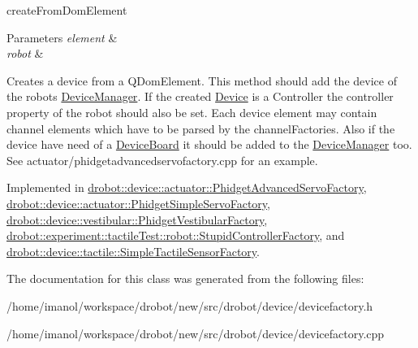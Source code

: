 create\-From\-Dom\-Element 


\begin{DoxyParams}{Parameters}
{\em element} & \\
\hline
{\em robot} & \\
\hline
\end{DoxyParams}
Creates a device from a Q\-Dom\-Element. This method should add the device of the robots \hyperlink{classdrobot_1_1device_1_1DeviceManager}{Device\-Manager}. If the created \hyperlink{classdrobot_1_1device_1_1Device}{Device} is a Controller the controller property of the robot should also be set. Each device element may contain channel elements which have to be parsed by the channel\-Factories. Also if the device have need of a \hyperlink{classdrobot_1_1device_1_1DeviceBoard}{Device\-Board} it should be added to the \hyperlink{classdrobot_1_1device_1_1DeviceManager}{Device\-Manager} too. See actuator/phidgetadvancedservofactory.\-cpp for an example. 

Implemented in \hyperlink{classdrobot_1_1device_1_1actuator_1_1PhidgetAdvancedServoFactory_a05fc8ede82777f4310ac0cf96e705dbe}{drobot\-::device\-::actuator\-::\-Phidget\-Advanced\-Servo\-Factory}, \hyperlink{classdrobot_1_1device_1_1actuator_1_1PhidgetSimpleServoFactory_a30cab321adc5079711b93fc452028736}{drobot\-::device\-::actuator\-::\-Phidget\-Simple\-Servo\-Factory}, \hyperlink{classdrobot_1_1device_1_1vestibular_1_1PhidgetVestibularFactory_ae877ec4a20bcd09fed94f00952b41f7d}{drobot\-::device\-::vestibular\-::\-Phidget\-Vestibular\-Factory}, \hyperlink{classdrobot_1_1experiment_1_1tactileTest_1_1robot_1_1StupidControllerFactory_aa5d84ac226f532590642a76a74e8df96}{drobot\-::experiment\-::tactile\-Test\-::robot\-::\-Stupid\-Controller\-Factory}, and \hyperlink{classdrobot_1_1device_1_1tactile_1_1SimpleTactileSensorFactory_a727416e619c23b25a01818e33f327d6c}{drobot\-::device\-::tactile\-::\-Simple\-Tactile\-Sensor\-Factory}.



The documentation for this class was generated from the following files\-:\begin{DoxyCompactItemize}
\item 
/home/imanol/workspace/drobot/new/src/drobot/device/devicefactory.\-h\item 
/home/imanol/workspace/drobot/new/src/drobot/device/devicefactory.\-cpp\end{DoxyCompactItemize}
